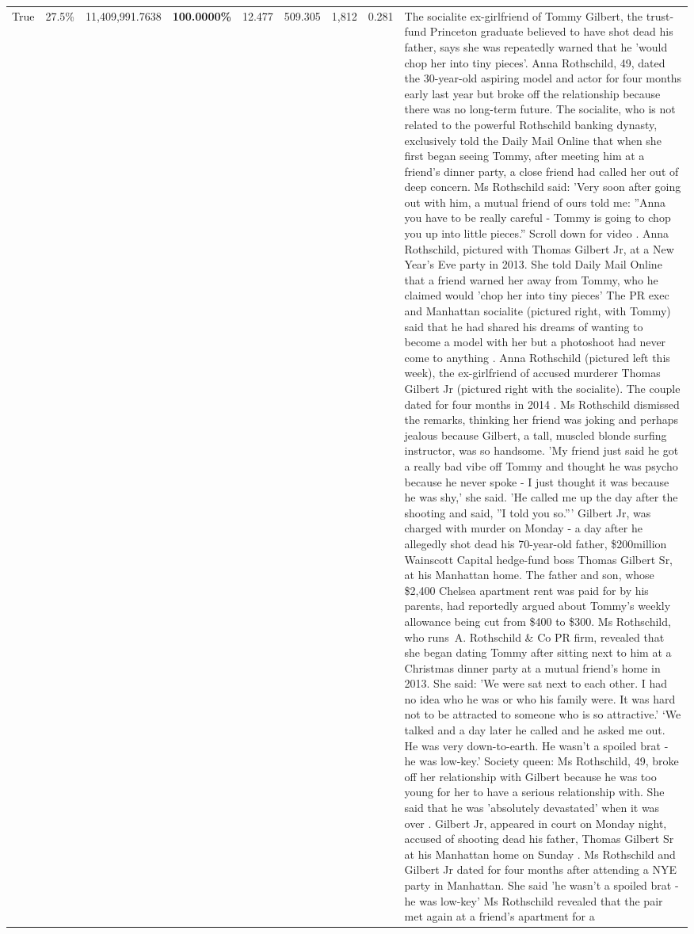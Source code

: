 \begin{table}[H]
\begin{tabular}{lllrlllll}
True & 27.5\% & 11,409,991.7638 & \bfseries \color{red} 100.0000\% & 12.477 & 509.305 & 1,812 & 0.281 & The socialite ex-girlfriend of Tommy Gilbert, the trust-fund Princeton graduate believed to have shot dead his father, says she was repeatedly warned that he 'would chop her into tiny pieces'. Anna Rothschild, 49, dated the 30-year-old aspiring model and actor for four months early last year but broke off the relationship because there was no long-term future. The socialite, who is not related to the powerful Rothschild banking dynasty, exclusively told the Daily Mail Online that when she first began seeing Tommy, after meeting him at a friend's dinner party, a close friend had called her out of deep concern. Ms Rothschild said: 'Very soon after going out with him, a mutual friend of ours told me: ''Anna you have to be really careful - Tommy is going to chop you up into little pieces.'' Scroll down for video . Anna Rothschild, pictured with Thomas Gilbert Jr, at a New Year's Eve party in 2013. She told Daily Mail Online that a friend warned her away from Tommy, who he claimed would 'chop her into tiny pieces' The PR exec and Manhattan socialite (pictured right, with Tommy) said that he had shared his dreams of wanting to become a model with her but a photoshoot had never come to anything . Anna Rothschild (pictured left this week), the ex-girlfriend of accused murderer Thomas Gilbert Jr (pictured right with the socialite). The couple dated for four months in 2014 . Ms Rothschild dismissed the remarks, thinking her friend was joking and perhaps jealous because Gilbert, a tall, muscled blonde surfing instructor, was so handsome. 'My friend just said he got a really bad vibe off Tommy and thought he was psycho because he never spoke - I just thought it was because he was shy,' she said. 'He called me up the day after the shooting and said, ''I told you so.''' Gilbert Jr, was charged with murder on Monday - a day after he allegedly shot dead his 70-year-old father, \$200million Wainscott Capital hedge-fund boss Thomas Gilbert Sr, at his Manhattan home. The father and son, whose \$2,400 Chelsea apartment rent was paid for by his parents, had reportedly argued about Tommy's weekly allowance being cut from \$400 to \$300. Ms Rothschild, who runs A. Rothschild \& Co PR firm, revealed that she began dating Tommy after sitting next to him at a Christmas dinner party at a mutual friend's home in 2013. She said: 'We were sat next to each other. I had no idea who he was or who his family were. It was hard not to be attracted to someone who is so attractive.' ‘We talked and a day later he called and he asked me out. He was very down-to-earth. He wasn’t a spoiled brat - he was low-key.’ Society queen: Ms Rothschild, 49, broke off her relationship with Gilbert because he was too young for her to have a serious relationship with. She said that he was 'absolutely devastated' when it was over . Gilbert Jr, appeared in court on Monday night, accused of shooting dead his father, Thomas Gilbert Sr at his Manhattan home on Sunday . Ms Rothschild and Gilbert Jr dated for four months after attending a NYE party in Manhattan. She said 'he wasn't a spoiled brat - he was low-key' Ms Rothschild revealed that the pair met again at a friend’s apartment for a 
\end{tabular}
\end{table}
